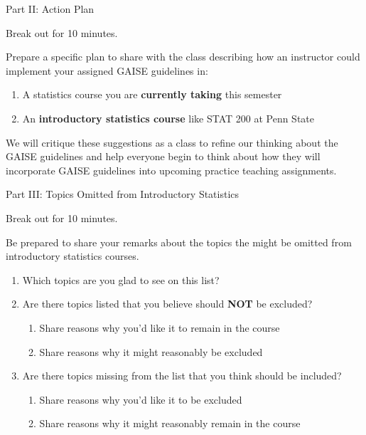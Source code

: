 \documentclass[compress]{beamer}
\begin{document}

\begin{frame}{Part II: Action Plan}

Break out for 10 minutes.
\vspace{.5cm}

Prepare a specific plan to share with the class describing how an instructor could implement your assigned GAISE guidelines in: 

\begin{enumerate}
    \item A statistics course you are \textbf{currently taking} this semester 
    \item An \textbf{introductory statistics course} like STAT 200 at Penn State 
\end{enumerate}
We will critique these suggestions as a class to refine our thinking about the GAISE guidelines and help everyone begin to think about how they will incorporate GAISE guidelines into upcoming practice teaching assignments.
\end{frame}


\begin{frame}{Part III: Topics Omitted from Introductory Statistics}

Break out for 10 minutes.
\vspace{.5cm}

Be prepared to share your remarks about the topics the might be omitted from introductory statistics courses.  

\begin{enumerate}
    \item Which topics are you glad to see on this list?
    \item Are there topics listed that you believe should \textbf{NOT} be excluded?
    \begin{enumerate}
        \item Share reasons why you'd like it to remain in the course
        \item Share reasons why it might reasonably be excluded
    \end{enumerate}
    \item Are there topics missing from the list that you think should be included?
    \begin{enumerate}
        \item Share reasons why you'd like it to be excluded
        \item Share reasons why it might reasonably remain in the course
    \end{enumerate}
\end{enumerate}
    
\end{frame}
\end{document}
